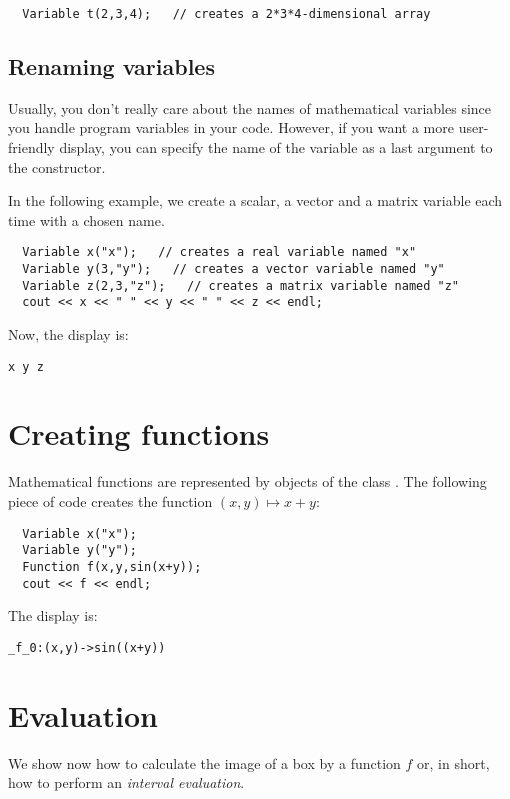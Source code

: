 \begin{lstlisting}
  Variable t(2,3,4);   // creates a 2*3*4-dimensional array
\end{lstlisting}


\subsection{Renaming variables}\label{sec:mod-var-name}
Usually, you don't really care about the names of mathematical variables since you handle
program variables in your code.
However, if you want a more user-friendly display, you can specify
the name of the variable as a last argument to the constructor.

In the following example, we create a scalar, a vector and a matrix variable each
time with a chosen name.

\begin{lstlisting}
  Variable x("x");   // creates a real variable named "x"
  Variable y(3,"y");   // creates a vector variable named "y"
  Variable z(2,3,"z");   // creates a matrix variable named "z"
  cout << x << " " << y << " " << z << endl;
\end{lstlisting}

Now, the display is:
\begin{lstlisting}
x y z
\end{lstlisting}


\section{Creating functions}

Mathematical functions are represented by objects of the class .
The following piece of code creates the function
$(x,y)\mapsto x+y$:

\begin{lstlisting}	
  Variable x("x");
  Variable y("y");
  Function f(x,y,sin(x+y));
  cout << f << endl;
\end{lstlisting}

The display is:
\begin{lstlisting}
_f_0:(x,y)->sin((x+y))
\end{lstlisting}
\section{Evaluation}

We show now how to calculate the image of a box by a function $f$ or, in short, how
to perform an {\it interval evaluation}.


